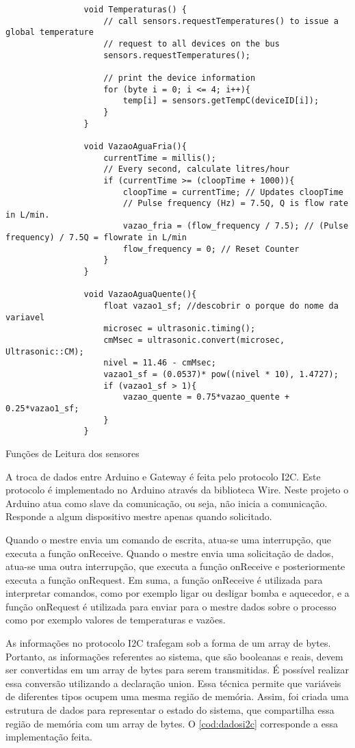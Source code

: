 			\begin{listing}[!htb]
				\begin{verbatim}
				void Temperaturas() {
					// call sensors.requestTemperatures() to issue a global temperature 
					// request to all devices on the bus
					sensors.requestTemperatures();
				
					// print the device information
					for (byte i = 0; i <= 4; i++){
						temp[i] = sensors.getTempC(deviceID[i]);
					}
				}
				
				void VazaoAguaFria(){
					currentTime = millis();
					// Every second, calculate litres/hour
					if (currentTime >= (cloopTime + 1000)){
						cloopTime = currentTime; // Updates cloopTime
						// Pulse frequency (Hz) = 7.5Q, Q is flow rate in L/min.
						vazao_fria = (flow_frequency / 7.5); // (Pulse frequency) / 7.5Q = flowrate in L/min
						flow_frequency = 0; // Reset Counter
					}
				}
				
				void VazaoAguaQuente(){
					float vazao1_sf; //descobrir o porque do nome da variavel
					microsec = ultrasonic.timing();
					cmMsec = ultrasonic.convert(microsec, Ultrasonic::CM);
					nivel = 11.46 - cmMsec;
					vazao1_sf = (0.0537)* pow((nivel * 10), 1.4727);
					if (vazao1_sf > 1){
						vazao_quente = 0.75*vazao_quente + 0.25*vazao1_sf;
					}
				}	
				\end{verbatim}
				\caption{Funções de Leitura dos sensores}
				\label{cod:arduino}
			\end{listing}
			
			A troca de dados entre Arduino e Gateway é feita pelo protocolo I2C. Este protocolo é implementado no Arduino através da biblioteca Wire. Neste projeto o Arduino atua como slave da comunicação, ou seja, não inicia a comunicação. Responde a algum dispositivo mestre apenas quando solicitado.
			 
			Quando o mestre envia um comando de escrita, atua-se uma interrupção, que executa a função onReceive. Quando o mestre envia uma solicitação de dados, atua-se uma outra interrupção, que executa a função onReceive e posteriormente executa a função onRequest. Em suma, a função onReceive é utilizada para interpretar comandos, como por exemplo ligar ou desligar bomba e aquecedor, e a função onRequest é utilizada para enviar para o mestre dados sobre o processo como por exemplo valores de temperaturas e vazões.
			
			As informações no protocolo I2C trafegam sob a forma de um array de bytes. Portanto, as informações referentes ao sistema, que são booleanas e reais, devem ser convertidas em um array de bytes para serem transmitidas.  É possível realizar essa conversão utilizando a declaração union. Essa técnica permite que variáveis de diferentes tipos ocupem uma mesma região de memória. Assim, foi criada uma estrutura de dados para representar o estado do sistema, que compartilha essa região de memória com um array de bytes. O \autoref{cod:dadosi2c} corresponde a essa implementação feita.
			
